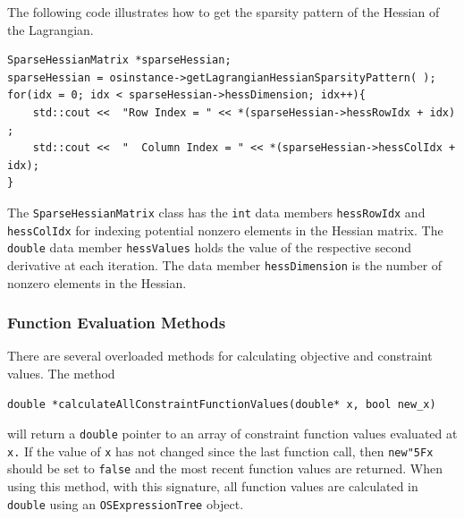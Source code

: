 \documentclass[11pt]{article}
\renewcommand{\_}{{\char"5F}}
\renewcommand{\{}{{\char"7B}}
\renewcommand{\}}{{\char"7D}}
\renewcommand{\^}{{\char"0D}}
\renewcommand{\'}{{\char"0D}}
\begin{document}
\begin{enumerate}[Step 1:]
The following code illustrates how to get the sparsity pattern of the Hessian of the Lagrangian.
\begin{verbatim}
SparseHessianMatrix *sparseHessian;
sparseHessian = osinstance->getLagrangianHessianSparsityPattern( );
for(idx = 0; idx < sparseHessian->hessDimension; idx++){
    std::cout <<  "Row Index = " << *(sparseHessian->hessRowIdx + idx) ;
    std::cout <<  "  Column Index = " << *(sparseHessian->hessColIdx + idx);
}
\end{verbatim}
The {\tt SparseHessianMatrix} class has the {\tt int} data members {\tt hessRowIdx} and {\tt hessColIdx} 
for indexing  potential nonzero elements in the Hessian matrix. The {\tt double} data member {\tt hessValues} 
holds the value of the respective second derivative at each iteration.   
The data member {\tt hessDimension} is the number of nonzero elements in the Hessian.


\subsubsection{Function Evaluation Methods}

There are several overloaded methods for calculating objective and constraint values.  The method
\begin{verbatim}
double *calculateAllConstraintFunctionValues(double* x, bool new_x)
\end{verbatim}
will return a {\tt double} pointer to an array of constraint function values evaluated at {\tt x.}  
If the value of {\tt x} has not changed since the last function call, then {\tt new\_x} should be set 
to {\tt false} and the most recent function values are returned.  When using this method, with this signature,  
all function values are calculated in {\tt double} using an {\tt OSExpressionTree} object.


\end{enumerate}
\end{document}
